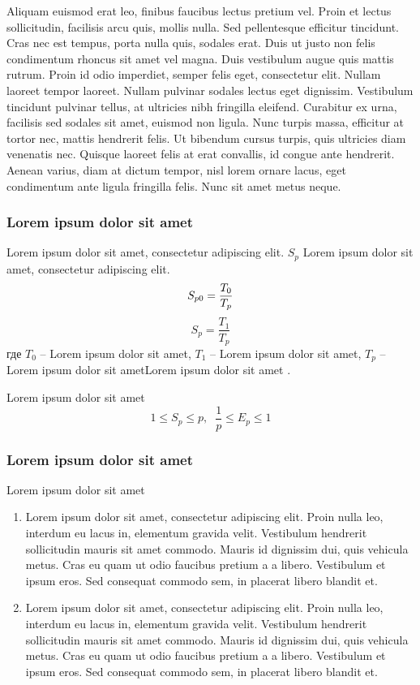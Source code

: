 Aliquam euismod erat leo, finibus faucibus lectus pretium vel. Proin et lectus sollicitudin, facilisis arcu quis, mollis nulla. Sed pellentesque efficitur tincidunt. Cras nec est tempus, porta nulla quis, sodales erat. Duis ut justo non felis condimentum rhoncus sit amet vel magna. Duis vestibulum augue quis mattis rutrum. Proin id odio imperdiet, semper felis eget, consectetur elit. Nullam laoreet tempor laoreet. Nullam pulvinar sodales lectus eget dignissim. Vestibulum tincidunt pulvinar tellus, at ultricies nibh fringilla eleifend. Curabitur ex urna, facilisis sed sodales sit amet, euismod non ligula. Nunc turpis massa, efficitur at tortor nec, mattis hendrerit felis. Ut bibendum cursus turpis, quis ultricies diam venenatis nec. Quisque laoreet felis at erat convallis, id congue ante hendrerit. Aenean varius, diam at dictum tempor, nisl lorem ornare lacus, eget condimentum ante ligula fringilla felis. Nunc sit amet metus neque.
\subsubsection{Lorem ipsum dolor sit amet}
Lorem ipsum dolor sit amet, consectetur adipiscing elit.  $S_{p}$ Lorem ipsum dolor sit amet, consectetur adipiscing elit. 
\begin{equation}
S_{p0}=\frac{T_{0} }{T_{p}} \\
\label{F:100}
\end{equation}
\begin{equation}
S_{p}=\frac{T_{1} }{T_{p}}
\label{F:101}
\end{equation}
где $T_{0}$ -- Lorem ipsum dolor sit amet, $T_{1}$ -- Lorem ipsum dolor sit amet, $T_{p}$ -- Lorem ipsum dolor sit ametLorem ipsum dolor sit amet \cite{book2}. 

Lorem ipsum dolor sit amet
\begin{equation}
1\leq S_{p} \leq p,\; \;  \frac{1}{p} \leq E_{p} \leq 1
\label{F:103}
\end{equation}



\subsubsection{Lorem ipsum dolor sit amet}
Lorem ipsum dolor sit amet
\begin{enumerate}
\item Lorem ipsum dolor sit amet, consectetur adipiscing elit. Proin nulla leo, interdum eu lacus in, elementum gravida velit. Vestibulum hendrerit sollicitudin mauris sit amet commodo. Mauris id dignissim dui, quis vehicula metus. Cras eu quam ut odio faucibus pretium a a libero. Vestibulum et ipsum eros. Sed consequat commodo sem, in placerat libero blandit et.
\item Lorem ipsum dolor sit amet, consectetur adipiscing elit. Proin nulla leo, interdum eu lacus in, elementum gravida velit. Vestibulum hendrerit sollicitudin mauris sit amet commodo. Mauris id dignissim dui, quis vehicula metus. Cras eu quam ut odio faucibus pretium a a libero. Vestibulum et ipsum eros. Sed consequat commodo sem, in placerat libero blandit et.
 
\end{enumerate}
